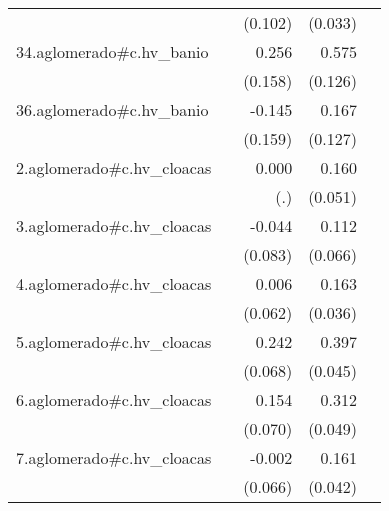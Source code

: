 {\begin{longtable}{l*{4}{D{.}{.}{-1}}}
            &                     &     (0.102)         &     (0.033)         &                     \\
\addlinespace
34.aglomerado#c.hv\_banio&                     &       0.256         &       0.575\sym{***}&                     \\
            &                     &     (0.158)         &     (0.126)         &                     \\
\addlinespace
36.aglomerado#c.hv\_banio&                     &      -0.145         &       0.167         &                     \\
            &                     &     (0.159)         &     (0.127)         &                     \\
\addlinespace
2.aglomerado#c.hv\_cloacas&                     &       0.000         &       0.160\sym{**} &                     \\
            &                     &         (.)         &     (0.051)         &                     \\
\addlinespace
3.aglomerado#c.hv\_cloacas&                     &      -0.044         &       0.112         &                     \\
            &                     &     (0.083)         &     (0.066)         &                     \\
\addlinespace
4.aglomerado#c.hv\_cloacas&                     &       0.006         &       0.163\sym{***}&                     \\
            &                     &     (0.062)         &     (0.036)         &                     \\
\addlinespace
5.aglomerado#c.hv\_cloacas&                     &       0.242\sym{***}&       0.397\sym{***}&                     \\
            &                     &     (0.068)         &     (0.045)         &                     \\
\addlinespace
6.aglomerado#c.hv\_cloacas&                     &       0.154\sym{*}  &       0.312\sym{***}&                     \\
            &                     &     (0.070)         &     (0.049)         &                     \\
\addlinespace
7.aglomerado#c.hv\_cloacas&                     &      -0.002         &       0.161\sym{***}&                     \\
            &                     &     (0.066)         &     (0.042)         &                     \\

\end{longtable}}

